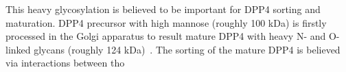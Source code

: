 This heavy glycosylation is believed to be important for DPP4 sorting and maturation. DPP4 precursor with high mannose (roughly 100 kDa) is firstly processed in the Golgi apparatus to result mature DPP4 with heavy N- and O-linked glycans (roughly 124 kDa)~\cite{Matter_1991}. The sorting of the mature DPP4 is believed via interactions between tho